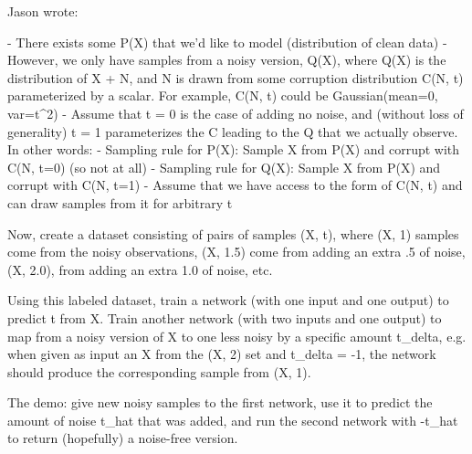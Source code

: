 \documentclass{article}
\begin{document}
Jason wrote: {- There exists some P(X) that we'd like to model (distribution of clean data)
 - However, we only have samples from a noisy version, Q(X), where
Q(X) is the distribution of X + N, and N is drawn from some corruption distribution C(N, t) parameterized by a scalar. For example, C(N, t) could be Gaussian(mean=0, var=t^2)
- Assume that t = 0 is the case of adding no noise, and (without loss of generality) t = 1 parameterizes the C leading to the Q that we actually observe. In other words:
    - Sampling rule for P(X): Sample X from P(X) and corrupt with C(N,
t=0) (so not at all)
    - Sampling rule for Q(X): Sample X from P(X) and corrupt with C(N, t=1)
 - Assume that we have access to the form of C(N, t) and can draw samples from it for arbitrary t

 Now, create a dataset consisting of pairs of samples (X, t), where (X, 1) samples come from the noisy observations, (X, 1.5) come from adding an extra .5 of noise, (X, 2.0), from adding an extra 1.0 of noise, etc.

 Using this labeled dataset, train a network (with one input and one output) to predict t from X.
 Train another network (with two inputs and one output) to map from a noisy version of X to one less noisy by a specific amount t_delta, e.g. when given as input an X from the (X, 2) set and t_delta = -1, the network should produce the corresponding sample from (X, 1).

 The demo: give new noisy samples to the first network, use it to predict the amount of noise t_hat that was added, and run the second network with -t_hat to return (hopefully) a noise-free version.

}
\end{document}
